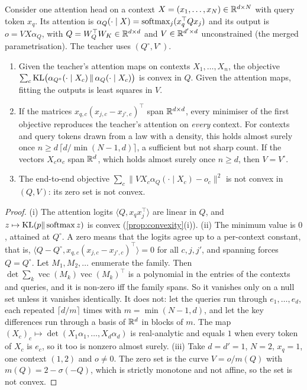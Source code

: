 \begin{proposition}\label{prop:attention-convex}
\Pv\Ck Consider one attention head on a context $X=(x_1,\dots,x_N)\in\mathbb{R}^{d\times N}$ with query token $x_q$. Its attention is
$\alpha_Q(\cdot\mid X)=\operatorname{softmax}_j(x_q^\top Qx_j)$ and its output is $o=VX\alpha_Q$, with $Q=W_Q^\top W_K\in\mathbb{R}^{d\times d}$ and $V\in\mathbb{R}^{d'\times d}$
unconstrained (the merged parametrisation). The teacher uses $(Q^\circ,V^\circ)$.
\begin{enumerate}[label=(\roman*),nosep]
\item Given the teacher's attention maps on contexts $X_1,\dots,X_n$, the objective
$\sum_c\mathrm{KL}\big(\alpha_{Q^\circ}(\cdot\mid X_c)\,\|\,\alpha_Q(\cdot\mid X_c)\big)$ is convex in $Q$. Given the attention maps, fitting the
outputs is least squares in $V$.
\item If the matrices $x_{q,c}(x_{j,c}-x_{j',c})^\top$ span $\mathbb{R}^{d\times d}$, every minimiser of the first objective reproduces the
teacher's attention on \emph{every} context. For contexts and query tokens drawn from a law with a density, this holds almost surely once
$n\ge d\,\lceil d/\min(N-1,d)\rceil$, a sufficient but not sharp count. If the vectors $X_c\alpha_c$ span $\mathbb{R}^d$, which holds almost surely once $n\ge d$, then $V=V^\circ$.
\item The end-to-end objective $\sum_c\|VX_c\alpha_Q(\cdot\mid X_c)-o_c\|^2$ is not convex in $(Q,V)$: its zero set is not convex.
\end{enumerate}
\end{proposition}
\begin{proof}
(i) The attention logits $\langle Q,x_qx_j^\top\rangle$ are linear in $Q$, and $z\mapsto\mathrm{KL}(p\|\operatorname{softmax} z)$ is convex
(\cref{prop:convexity}(i)). (ii) The minimum value is $0$, attained at $Q^\circ$. A zero means that the logits agree up to a
per-context constant, that is, $\langle Q-Q^\circ,x_{q,c}(x_{j,c}-x_{j',c})^\top\rangle=0$ for all $c,j,j'$, and spanning forces $Q=Q^\circ$.
Let $M_1,M_2,\dots$ enumerate the family. Then $\det\sum_k\operatorname{vec}(M_k)\operatorname{vec}(M_k)^\top$ is a polynomial in the
entries of the contexts and queries, and it is non-zero iff the family spans. So it vanishes only on a null set unless it
vanishes identically. It does not: let the queries run through $e_1,\dots,e_d$, each repeated $\lceil d/m\rceil$ times with
$m=\min(N-1,d)$, and let the key differences run through a basis of $\mathbb{R}^d$ in blocks of $m$. The map
$(X_c)_c\mapsto\det(X_1\alpha_1,\dots,X_d\alpha_d)$ is real-analytic and equals $1$ when every token of $X_c$ is $e_c$, so it too is
nonzero almost surely. (iii) Take $d=d'=1$, $N=2$, $x_q=1$, one context $(1,2)$ and $o\neq0$. The zero set is the curve
$V=o/m(Q)$ with $m(Q)=2-\sigma(-Q)$, which is strictly monotone and not affine, so the set is not convex.
\end{proof}

